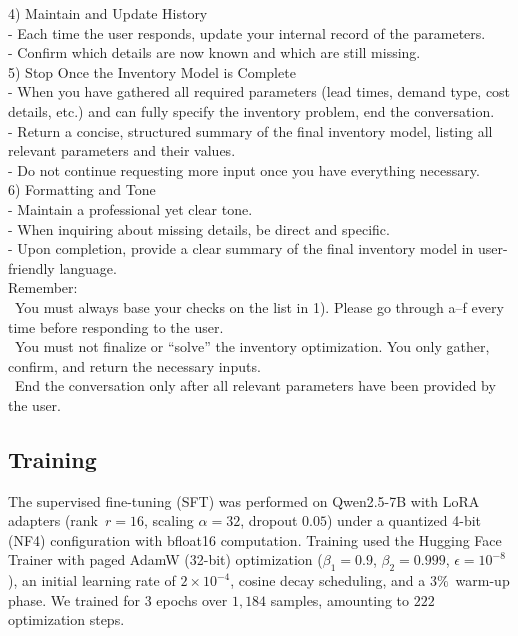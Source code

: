 \begin{table}[t]
\begin{tcolorbox}
    4) Maintain and Update History\\
    \quad - Each time the user responds, update your internal record of the parameters.\\
    \quad - Confirm which details are now known and which are still missing.\\[0pt]
    
    5) Stop Once the Inventory Model is Complete\\
    \quad - When you have gathered all required parameters (lead times, demand type, cost details, etc.) and can fully specify the inventory problem, end the conversation.\\
    \quad - Return a concise, structured summary of the final inventory model, listing all relevant parameters and their values.\\
    \quad - Do not continue requesting more input once you have everything necessary.\\[0pt]
    
    6) Formatting and Tone\\
    \quad - Maintain a professional yet clear tone.\\
    \quad - When inquiring about missing details, be direct and specific.\\
    \quad - Upon completion, provide a clear summary of the final inventory model in user-friendly language.\\[0pt]
    
    Remember:\\
    \quad \textbullet\ You must always base your checks on the list in 1). Please go through a--f every time before responding to the user.\\
    \quad \textbullet\ You must not finalize or ``solve'' the inventory optimization. You only gather, confirm, and return the necessary inputs.\\
    \quad \textbullet\ End the conversation only after all relevant parameters have been provided by the user.
    \end{tcolorbox}
    \caption{System prompt governing the conversational agent used in data collection.}
    \label{tab:system_prompt}
    \end{table}
    

    \subsection{Training}
    \label{sec:SFTtraining}

        The supervised fine-tuning (SFT) was performed on {\sf Qwen2.5-7B} with {\sf LoRA} adapters (rank~\mbox{$r=16$}, scaling $\alpha=32$, dropout $0.05$) under a quantized 4-bit ({\sf NF4}) configuration with {\sf bfloat16} computation. Training used the {\sf Hugging Face Trainer} with {\sf paged AdamW} (32-bit) optimization ($\beta_1 = 0.9$, $\beta_2 = 0.999$, $\epsilon = 10^{-8}$), an initial learning rate of $2\times 10^{-4}$, cosine decay scheduling, and a \mbox{$3\%$}~warm-up phase. We trained for $3$ epochs over $1,184$ samples, amounting to $222$ optimization steps.

